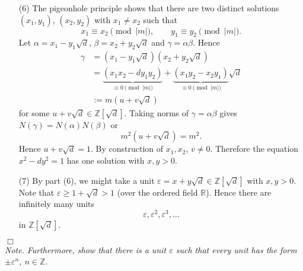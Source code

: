 \documentclass{article}
\begin{document}
\begin{enumerate}
\item[(6)]
  The pigeonhole principle shows that there are two distinct solutions $(x_1,y_1)$, $(x_2,y_2)$
  with $x_1 \neq x_2$ such that
  \[
    x_1 \equiv x_2 \pmod{|m|},
    \qquad 
    y_1 \equiv y_2 \pmod{|m|}.
  \]
  Let $\alpha = x_1 - y_1\sqrt{d}$, $\beta = x_2 + y_2\sqrt{d}$ and $\gamma = \alpha\beta$.
  Hence
  \begin{align*}
    \gamma
    &= (x_1 - y_1\sqrt{d})(x_2 + y_2\sqrt{d}) \\
    &= \underbrace{(x_1 x_2 - d y_1 y_2)}_{\equiv 0 \pmod{|m|}}
        + \underbrace{(x_1 y_2 - x_2 y_1)}_{\equiv 0 \pmod{|m|}}\sqrt{d} \\
    &:= m(u + v\sqrt{d})
  \end{align*}
  for some $u + v\sqrt{d} \in \mathbb{Z}[\sqrt{d}]$.
  Taking norms of $\gamma = \alpha\beta$ gives $N(\gamma) = N(\alpha)N(\beta)$ or
  \[
    m^2 (u + v\sqrt{d}) = m^2.
  \]
  Hence $u + v\sqrt{d} = 1$.
  By construction of $x_1, x_2$, $v \neq 0$.
  Therefore the equation $x^2 - dy^2 = 1$ has one solution with $x, y > 0$.

\item[(7)]
  By part (6), we might take a unit $\varepsilon = x + y\sqrt{d} \in \mathbb{Z}[\sqrt{d}]$
  with $x, y > 0$.
  Note that $\varepsilon \geq 1 + \sqrt{d} > 1$ (over the ordered field $\mathbb{R}$).
  Hence there are infinitely many units
  \[
    \varepsilon, \varepsilon^2, \varepsilon^3, \ldots
  \]
  in $\mathbb{Z}[\sqrt{d}]$.
\end{enumerate}
$\Box$ \\



\emph{Note.}
  \emph{Furthermore, show that there is a unit $\varepsilon$ such that every unit has the form
  $\pm \varepsilon^n$, $n \in \mathbb{Z}$.} \\
\end{document}
